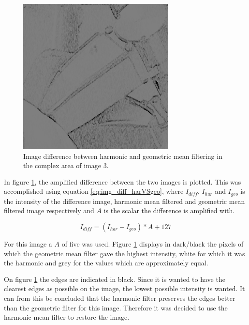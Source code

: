 \begin{figure}[H]
\centering
\includegraphics[width= 0.9 \linewidth]{../code/images/image_harVSgeo_complex_03}
\caption{Image difference between harmonic and geometric mean filtering in the complex area of image 3.}
\label{fig:diff_harVSgeo_im03}
\end{figure}


In figure \ref{fig:diff_harVSgeo_im03}, the amplified difference between the two images is plotted.
This was accomplished using equation \ref{eq:img_diff_harVSgeo}, where $I_{diff}$, $I_{har}$ and $I_{geo}$ is the intensity of the difference image, harmonic mean filtered and geometric mean filtered image respectively and $A$ is the scalar the difference is amplified with.

\begin{equation}
I_{diff} = \left( I_{har} - I_{geo} \right) * A + 127
\label{eq:img_diff_harVSgeo}
\end{equation}

For this image a $A$ of five was used.
Figure \ref{fig:diff_harVSgeo_im03} displays in dark/black the pixels of which the geometric mean filter gave the highest intensity, white for which it was the harmonic and grey for the values which are approximately equal.

On figure \ref{fig:diff_harVSgeo_im03} the edges are indicated in black.
Since it is wanted to have the clearest edges as possible on the image, the lowest possible intensity is wanted.
It can from this be concluded that the harmonic filter preserves the edges better than the geometric filter for this image.
Therefore it was decided to use the harmonic mean filter to restore the image.


